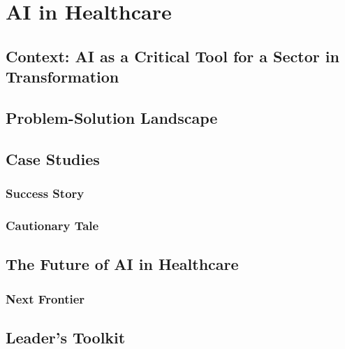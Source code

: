 \chapter{AI in Healthcare}
\label{chap:ai_in_healthcare}

\section{Context: AI as a Critical Tool for a Sector in Transformation}
\label{sec:healthcare_context}

\section{Problem-Solution Landscape}
\label{sec:healthcare_problem_solution}

\section{Case Studies}
\label{sec:healthcare_case_studies}
\subsection{Success Story}
\label{sec:healthcare_success_story}
\subsection{Cautionary Tale}
\label{sec:healthcare_cautionary_tale}

\section{The Future of AI in Healthcare}
\label{sec:future_of_ai_in_healthcare}
\subsection{Next Frontier}
\label{sec:healthcare_next_frontier}

\section{Leader's Toolkit}
\label{sec:healthcare_leaders_toolkit}